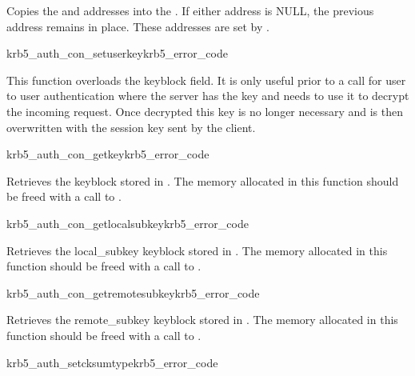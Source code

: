 Copies the  and  addresses
into the . If either address is NULL, the previous
address remains in place. These addresses are set by
. 

\begin{funcdecl}{krb5_auth_con_setuserkey}{krb5_error_code}{\funcinout}
\funcin
{}
\end{funcdecl}

This function overloads the keyblock field. It is only useful prior to a
 call for user to user authentication where
the server has the key and needs to use it to decrypt the incoming
request.  Once decrypted this key is no longer necessary and is then
overwritten with the session key sent by the client. 

\begin{funcdecl}{krb5_auth_con_getkey}{krb5_error_code}{\funcinout}
\funcout
{}
\end{funcdecl}

Retrieves the keyblock stored in . The memory
allocated in this function should be freed with a call to
. 

\begin{funcdecl}{krb5_auth_con_getlocalsubkey}{krb5_error_code}{\funcinout}
\funcout
{}
\end{funcdecl}

Retrieves the local_subkey keyblock stored in
. The memory allocated in this function should
be freed with a call to .

\begin{funcdecl}{krb5_auth_con_getremotesubkey}{krb5_error_code}{\funcinout}
\funcout
{}
\end{funcdecl}

Retrieves the remote_subkey keyblock stored in
. The memory allocated in this function should
be freed with a call to .


\begin{funcdecl}{krb5_auth_setcksumtype}{krb5_error_code}{\funcinout}
\funcin
{}
\end{funcdecl}

